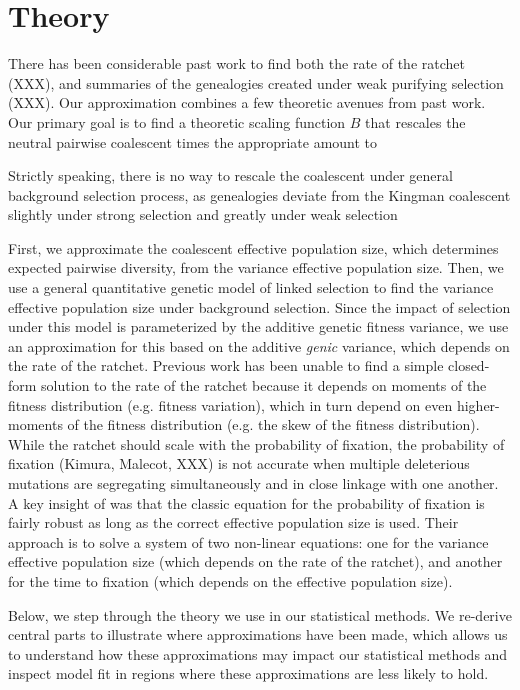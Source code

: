 \documentclass[11pt]{article}
\begin{document}
\section*{Theory}

There has been considerable past work to find both the rate of the ratchet
(XXX), and summaries of the genealogies created under weak purifying selection
(XXX). Our approximation combines a few theoretic avenues from past work. Our
primary goal is to find a theoretic scaling function $B$ that rescales the neutral
pairwise coalescent times the appropriate amount to 

Strictly speaking, there is no way to rescale the coalescent under general
background selection process, as genealogies deviate from the Kingman
coalescent slightly under strong selection
\parencite{Walczak2012-fi,Cvijovic2018-vd} and greatly under weak selection
\parencite{OFallon2010-my}

First, we approximate the coalescent effective population size, which
determines expected pairwise diversity, from the variance effective population
size. Then, we use a general quantitative genetic model of linked selection to
find the variance effective population size under background selection. Since
the impact of selection under this model is parameterized by the additive
genetic fitness variance, we use an approximation for this based on the
additive \emph{genic} variance, which depends on the rate of the ratchet.
Previous work has been unable to find a simple closed-form solution to the rate
of the ratchet because it depends on moments of the fitness distribution (e.g.
fitness variation), which in turn depend on even higher-moments of the fitness
distribution (e.g. the skew of the fitness distribution). While the ratchet
should scale with the probability of fixation, the probability of fixation
(Kimura, Malecot, XXX) is not accurate when multiple deleterious mutations are
segregating simultaneously and in close linkage with one another. A key insight
of \textcite{Santiago2016-mu} was that the classic equation for the probability
of fixation is fairly robust as long as the correct effective population size
is used. Their approach is to solve a system of two non-linear equations: one
for the variance effective population size (which depends on the rate of the
ratchet), and another for the time to fixation (which depends on the effective
population size).

Below, we step through the theory we use in our statistical methods. We
re-derive central parts to illustrate where approximations have been made,
which allows us to understand how these approximations may impact our
statistical methods and inspect model fit in regions where these approximations
are less likely to hold.
\end{document}
